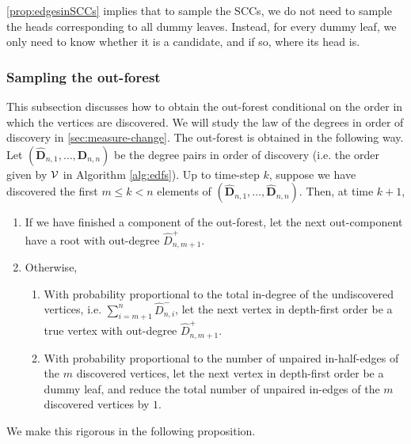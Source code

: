 \cref{prop:edgesinSCCs} implies that to sample the SCCs, we do not need to sample the heads corresponding to all dummy leaves. Instead, for every dummy leaf, we only need to know whether it is a candidate, and if so, where its head is. 
\subsubsection{Sampling the out-forest}\label{subsubsec.samplingoutforest}
This subsection discusses how to obtain the out-forest conditional on the order in which the vertices are discovered. We will study the law of the degrees in order of discovery in \cref{sec:measure-change}. The out-forest is obtained in the following way. Let $(\mathbf{\hat{D}}_{n,1},\dots,\mathbf{\hat{D}}_{n,n})$ be the degree pairs in order of discovery (i.e. the order given by $\mathcal V$ in Algorithm \ref{alg:edfs}). Up to time-step $k$, suppose we have discovered the first $m\leq k<n$ elements of  $(\mathbf{\hat{D}}_{n,1},\dots,\mathbf{\hat{D}}_{n,n})$. Then, at time $k+1$,
\begin{enumerate}
    \item If we have finished a component of the out-forest, let the next out-component have a root with out-degree $\hat{D}_{n,m+1}^+$. 
    \item Otherwise,
    \begin{enumerate}\item With probability proportional to the total in-degree of the undiscovered vertices, i.e. $\sum_{i={m+1}}^{n} \hat{D}_{n,i}^-$, let the next vertex in depth-first order be a true vertex with out-degree $\hat{D}_{n,m+1}^+$. 
    \item With probability proportional to the number of unpaired in-half-edges of the $m$ discovered vertices, let the next vertex in depth-first order be a dummy leaf, and reduce the total number of unpaired in-edges of the $m$ discovered vertices by $1$.
\end{enumerate}
\end{enumerate}
We make this rigorous in the following proposition.
